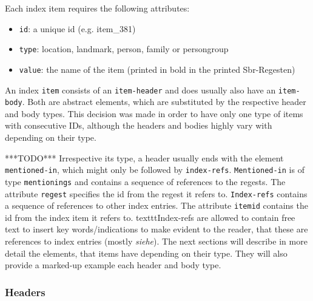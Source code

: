 Each index item requires the following attributes: 
\begin{itemize}
\item \texttt{id}: a unique id (e.g. item\_381)
\item \texttt{type}: location, landmark, person, family or persongroup
\item \texttt{value}: the name of the item (printed in bold in the printed Sbr-Regesten)
\end{itemize}


An index \texttt{item} consists of an \texttt{item-header} and does usually also have an \texttt{item-body}. Both are abstract elements, which are substituted by the respective header and body types. This decision was made in order to have only one type of items with consecutive IDs, although the headers and bodies highly vary with depending on their type.

***TODO***
Irrespective its type, a header usually ends with the element \texttt{mentioned-in}, which might only be followed by \texttt{index-refs}. \texttt{Mentioned-in} is of type \texttt{mentionings} and contains a sequence of references to the regests. The attribute \texttt{regest} specifies the id from the regest it refers to. \texttt{Index-refs} contains  a sequence of references to other index entries. The attribute \texttt{itemid} contains the id from the index item it refers to. texttt{Index-refs} are allowed to contain free text to insert key words/indications to make evident to the reader, that these are references to index entries (mostly \textit{siehe}).
The next sections will describe in more detail the elements, that items have depending on their type. They will also provide a marked-up example each header and body type.

\subsubsection{Headers}
\label{header-xml}

